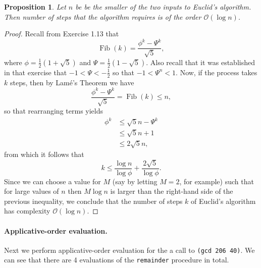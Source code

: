 \documentclass{article}
\newtheorem{proposition}{Proposition}
\DeclareMathOperator{\fib}{Fib}
\begin{document}

\begin{proposition}
  Let $n$ be be the smaller of the two inputs to Euclid's algorithm.  Then
  number of steps that the algorithm requires is of the order
  $\mathcal{O}(\log n)$.
\end{proposition}

\begin{proof}
  Recall from Exercise 1.13 that
  \begin{equation*}
    \fib(k) = \frac{\phi^k - \Psi^k}{\sqrt{5}},
  \end{equation*}
  where $\phi = \frac{1}{2}(1 + \sqrt{5})$ and
  $\Psi = \frac{1}{2}(1 - \sqrt{5})$.  Also recall that it was established in
  that exercise that $-1 < \Psi < -\frac{1}{2}$ so that $-1 < \Psi^n < 1$.  Now,
  if the process takes $k$ steps, then by Lam\'e's Theorem we have
  \begin{equation*}
    \frac{\phi^k - \Psi^k}{\sqrt{5}} = \fib(k) \leq n,
  \end{equation*}
  so that rearranging terms yields
  \begin{align*}
    \phi^k &\leq \sqrt{5} n - \Psi^k \\
           &\leq \sqrt{5} n + 1 \\
           &\leq 2\sqrt{5} n,
  \end{align*}
  from which it follows that
  \begin{equation*}
    k \leq \frac{ \log n }{ \log\phi } + \frac{ 2\sqrt{5} }{ \log\phi }.
  \end{equation*}
  Since we can choose a value for $M$ (say by letting $M = 2$, for example) such
  that for large values of $n$ then $M \log n$ is larger than the right-hand
  side of the previous inequality, we conclude that the number of steps $k$ of
  Euclid's algorithm has complexity $\mathcal{O}(\log n)$.
\end{proof}






\paragraph{Applicative-order evaluation.}  Next we perform applicative-order
evaluation for the a call to \lstinline{(gcd 206 40)}.  We can see that there
are 4 evaluations of the \lstinline{remainder} procedure in total.
\end{document}
